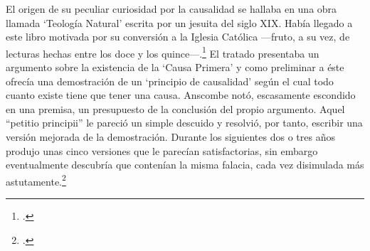 El origen de su peculiar curiosidad por la causalidad se hallaba en una obra
llamada `Teología Natural' escrita por un jesuita del siglo XIX. Había llegado a
este libro motivada por su conversión a la Iglesia Católica ---fruto, a su vez,
de lecturas hechas entre los doce y los quince---.\footcite[cf.~][p.~vii \S1]{M&PotM}
El tratado presentaba un argumento sobre la existencia de la `Causa Primera' y
como preliminar a éste ofrecía una demostración de un `principio de causalidad'
según el cual todo cuanto existe tiene que tener una causa. Anscombe notó,
escasamente escondido en una premisa, un presupuesto de la conclusión del propio
argumento. Aquel ``petitio principii'' le pareció un simple descuido y resolvió,
por tanto, escribir una versión mejorada de la demostración.
Durante los siguientes dos o tres años produjo unas cinco versiones que le
parecían satisfactorias, sin embargo eventualmente descubría que contenían la
misma falacia, cada vez disimulada más astutamente.\footcite[cf.~][p.~vii
\S2]{M&PotM} 

